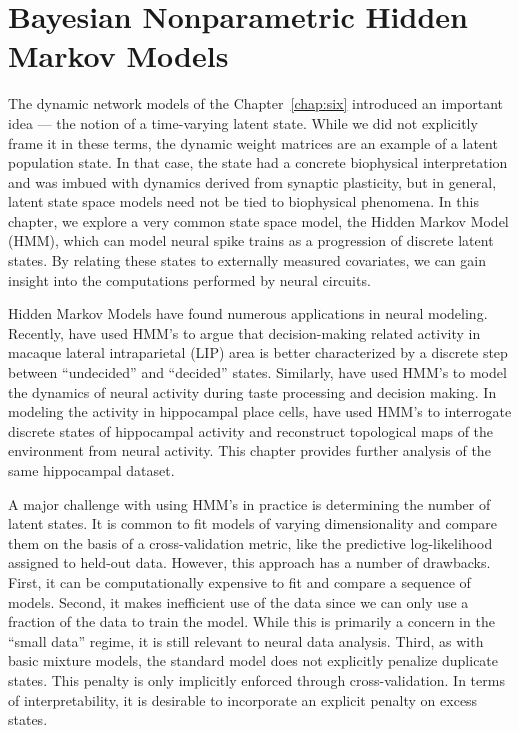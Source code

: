  
\chapter{Bayesian Nonparametric Hidden Markov Models}
\label{chap:seven}

The dynamic network models of the Chapter~\ref{chap:six} introduced 
an important idea --- the notion of a time-varying latent state. While 
we did not explicitly frame it in these terms, the dynamic weight 
matrices are an example of a latent population state. In that case, the state had 
a concrete biophysical interpretation and was imbued with dynamics derived from synaptic plasticity, 
but in general, latent state space models need not be tied 
to biophysical phenomena. In this chapter, we explore a very common 
state space model, the Hidden Markov Model (HMM), which can   
model neural spike trains as a progression of discrete latent states.
By relating these states to externally measured covariates,
we can gain insight into the computations performed by neural circuits.

Hidden Markov Models have found numerous applications in neural
modeling.  Recently, \citet{latimer2015single} have used HMM's to
argue that decision-making related activity in macaque lateral
intraparietal (LIP) area is better characterized by a discrete step
between ``undecided'' and ``decided'' states. Similarly, \citet{miller2010stochastic}
have used HMM's to model the dynamics of neural activity during taste 
processing and decision making. In modeling the activity in hippocampal
place cells, \citet{Chen12a, Chen14} have used HMM's to interrogate
discrete states of hippocampal activity and reconstruct topological 
maps of the environment from neural activity. This chapter provides
further analysis of the same hippocampal dataset.

A major challenge with using HMM's in practice is determining the number 
of latent states. It is common to fit models of varying dimensionality and 
compare them on the basis of a cross-validation metric, like the 
predictive log-likelihood assigned to held-out data. However, this approach 
has a number of drawbacks. First, it can be computationally expensive to fit and compare 
a sequence of models. Second, it makes inefficient use of the data since 
we can only use a fraction of the data to train the model. While this is 
primarily a concern in the ``small data'' regime, it is still relevant to 
neural data analysis. Third, as with basic mixture models, 
the standard model does not explicitly 
penalize duplicate states. This penalty is only implicitly 
enforced through cross-validation. In terms of interpretability, it is 
desirable to incorporate an explicit penalty on excess states. 


